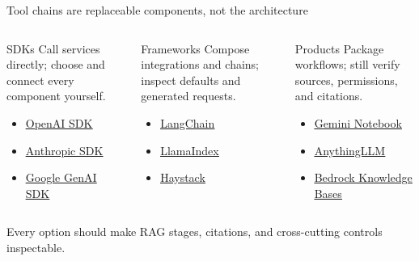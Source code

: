 \documentclass[aspectratio=169]{beamer}
\begin{document}
\begin{frame}{Tool chains are replaceable components, not the architecture}
\small
\begin{columns}[T,onlytextwidth]
\begin{block}{SDKs}
\scriptsize
Call services directly; choose and connect every component yourself.
\begin{itemize}\itemsep.35em
\item \href{https://developers.openai.com/api/docs/libraries}{\textcolor{brand}{\underline{OpenAI SDK}}}
\item \href{https://platform.claude.com/docs/en/cli-sdks-libraries/overview}{\textcolor{brand}{\underline{Anthropic SDK}}}
\item \href{https://ai.google.dev/gemini-api/docs/libraries}{\textcolor{brand}{\underline{Google GenAI SDK}}}
\end{itemize}
\end{block}
\begin{block}{Frameworks}
\scriptsize
Compose integrations and chains; inspect defaults and generated requests.
\begin{itemize}\itemsep.35em
\item \href{https://www.langchain.com/}{\textcolor{brand}{\underline{LangChain}}}
\item \href{https://www.llamaindex.ai/}{\textcolor{brand}{\underline{LlamaIndex}}}
\item \href{https://haystack.deepset.ai/}{\textcolor{brand}{\underline{Haystack}}}
\end{itemize}
\end{block}
\begin{block}{Products}
\scriptsize
Package workflows; still verify sources, permissions, and citations.
\begin{itemize}\itemsep.35em
\item \href{https://notebook.google/}{\textcolor{brand}{\underline{Gemini Notebook}}}
\item \href{https://docs.useanything.com/}{\textcolor{brand}{\underline{AnythingLLM}}}
\item \href{https://aws.amazon.com/bedrock/knowledge-bases/}{\textcolor{brand}{\underline{Bedrock Knowledge Bases}}}
\end{itemize}
\end{block}
\end{columns}
\vspace{.75em}
\centering\small
Every option should make RAG stages, citations, and cross-cutting controls inspectable.\par
\end{frame}
\end{document}
